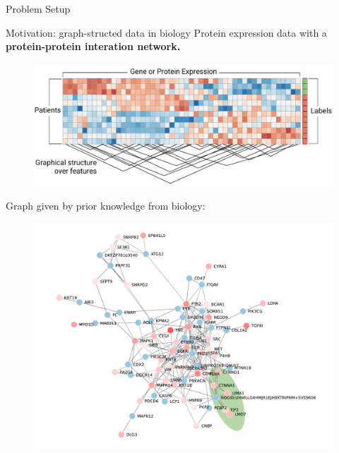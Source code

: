 \documentclass[svgnames,final]{beamer}
\begin{document}
\begin{frame}
\begin{columns}[T]
\begin{column}{.3\linewidth}
\begin{block}{Problem Setup}
    

	\end{block}

	\vspace{1.0cm}

	\begin{block}{Motivation: graph-structed data in biology}
		Protein expression data with a \textbf{protein-protein interation network.}\\[-.2cm]
		\begin{figure}[h]
		\centering
		\includegraphics[width=.8\linewidth]{images/matrix.pdf}
		\end{figure}

		Graph given by prior knowledge from biology:\\[-.6cm]

		\begin{figure}[h]
		\centering
		\includegraphics[width=0.7\linewidth]{images/graph.pdf}
		\end{figure}

		\vspace{-1.5cm}

	\end{block}

	\vspace{2cm}

\end{column}


\end{columns}
\end{frame}
\end{document}
